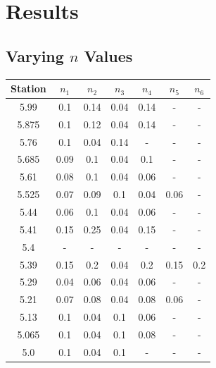 \section{Results}
\subsection{Varying $n$ Values}
\begin{center}


\begin{tabular}{|c|cccccc|} 
    \hline
    \textbf{Station} & $n_1$ & $n_2$ & $n_3$ & $n_4$ & $n_5$ & $n_6$  \\ 
    \hline
    5.99             & 0.1      & 0.14     & 0.04     & 0.14     & -        & -         \\
    5.875            & 0.1      & 0.12     & 0.04     & 0.14     & -        & -         \\
    5.76             & 0.1      & 0.04     & 0.14     & -        & -        & -         \\
    5.685            & 0.09     & 0.1      & 0.04     & 0.1      & -        & -         \\
    5.61             & 0.08     & 0.1      & 0.04     & 0.06     & -        & -         \\
    5.525            & 0.07     & 0.09     & 0.1      & 0.04     & 0.06     & -         \\
    5.44             & 0.06     & 0.1      & 0.04     & 0.06     & -        & -         \\
    5.41             & 0.15     & 0.25     & 0.04     & 0.15     & -        & -         \\
    5.4              & -        & -        & -        & -        & -        & -         \\
    5.39             & 0.15     & 0.2      & 0.04     & 0.2      & 0.15     & 0.2       \\
    5.29             & 0.04     & 0.06     & 0.04     & 0.06     & -        & -         \\
    5.21             & 0.07     & 0.08     & 0.04     & 0.08     & 0.06     & -         \\
    5.13             & 0.1      & 0.04     & 0.1      & 0.06     & -        & -         \\
    5.065            & 0.1      & 0.04     & 0.1      & 0.08     & -        & -         \\
    5.0              & 0.1      & 0.04     & 0.1      & -        & -        & -         \\

\end{tabular}
\end{center}

